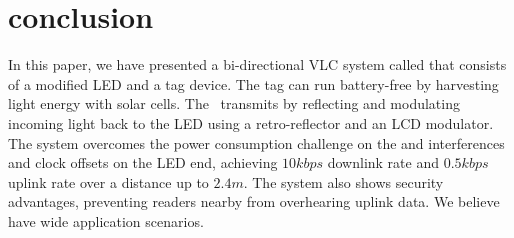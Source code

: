 \section{conclusion}
In this paper, we have presented a bi-directional VLC system called \retro that consists of a modified LED and a tag device. The tag can run battery-free by harvesting light energy with solar cells. The \vitag\ transmits by reflecting and modulating incoming light back to the LED using a retro-reflector and an LCD modulator. The system overcomes the power consumption challenge on the \vitag and interferences and clock offsets on the LED end, achieving $10kbps$ downlink rate and $0.5kbps$ uplink rate over a distance up to $2.4m$. The system also shows security advantages, preventing readers nearby from overhearing uplink data. We believe \retro have wide application scenarios.  